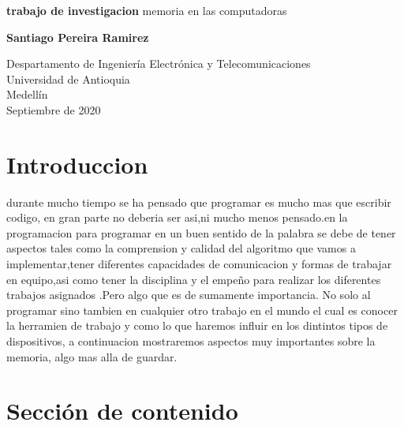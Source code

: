 \documentclass{article}
\begin{document}
\begin{titlepage}
    \begin{center}
        \vspace*{1cm}
            
        \Huge
        \textbf{trabajo de investigacion}
        \vspace{0.5cm}
        \LARGE
        memoria en las computadoras
            
        \vspace{1.5cm}
            
        \textbf{Santiago Pereira Ramirez}
            
        \vfill
            
        \vspace{0.8cm}
            
        \Large
        Despartamento de Ingeniería Electrónica y Telecomunicaciones\\
        Universidad de Antioquia\\
        Medellín\\
        Septiembre de 2020
            
    \end{center}
\end{titlepage}

\tableofcontents

\section{Introduccion}
durante mucho tiempo se ha pensado que programar es mucho mas que  escribir codigo, en gran parte no deberia ser asi,ni mucho menos pensado.en la programacion para programar en un buen sentido de la palabra se debe de tener aspectos tales como la comprension y calidad del algoritmo que vamos a implementar,tener diferentes capacidades de comunicacion 
y formas de trabajar en equipo,asi como tener la disciplina y el empeño para realizar los diferentes trabajos asignados .Pero algo que es de sumamente importancia.
No solo al programar sino tambien en cualquier otro trabajo en el mundo el cual es conocer la herramien de trabajo y como lo que haremos influir en los dintintos tipos de dispositivos, a continuacion mostraremos aspectos muy importantes sobre la memoria, algo mas alla de guardar.

\section{Sección de contenido} \label{contenido}
\end{document}
